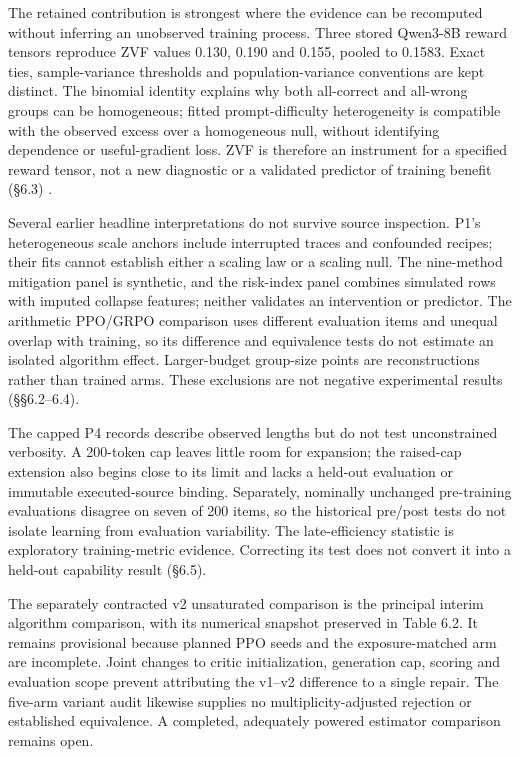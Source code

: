 \documentclass[12pt,a4paper]{report}
\begin{document}
The retained contribution is strongest where the evidence can be
recomputed without inferring an unobserved training process. Three
stored Qwen3-8B reward tensors reproduce ZVF values 0.130, 0.190 and
0.155, pooled to 0.1583. Exact ties, sample-variance thresholds and
population-variance conventions are kept distinct. The binomial identity
explains why both all-correct and all-wrong groups can be homogeneous;
fitted prompt-difficulty heterogeneity is compatible with the observed
excess over a homogeneous null, without identifying dependence or
useful-gradient loss. ZVF is therefore an instrument for a specified
reward tensor, not a new diagnostic or a validated predictor of training
benefit (§6.3) \citep{he2026avspo, nie2026starvation}.

Several earlier headline interpretations do not survive source
inspection. P1's heterogeneous scale anchors include interrupted traces
and confounded recipes; their fits cannot establish either a scaling law
or a scaling null. The nine-method mitigation panel is synthetic, and
the risk-index panel combines simulated rows with imputed collapse
features; neither validates an intervention or predictor. The arithmetic
PPO/GRPO comparison uses different evaluation items and unequal overlap
with training, so its difference and equivalence tests do not estimate
an isolated algorithm effect. Larger-budget group-size points are
reconstructions rather than trained arms. These exclusions are not
negative experimental results (§§6.2--6.4).

The capped P4 records describe observed lengths but do not test
unconstrained verbosity. A 200-token cap leaves little room for
expansion; the raised-cap extension also begins close to its limit and
lacks a held-out evaluation or immutable executed-source binding.
Separately, nominally unchanged pre-training evaluations disagree on
seven of 200 items, so the historical pre/post tests do not isolate
learning from evaluation variability. The late-efficiency statistic is
exploratory training-metric evidence. Correcting its test does not
convert it into a held-out capability result (§6.5).

The separately contracted v2 unsaturated comparison is the principal
interim algorithm comparison, with its numerical snapshot preserved in
Table 6.2. It remains provisional because planned PPO seeds and the
exposure-matched arm are incomplete. Joint changes to critic
initialization, generation cap, scoring and evaluation scope prevent
attributing the v1--v2 difference to a single repair. The five-arm
variant audit likewise supplies no multiplicity-adjusted rejection or
established equivalence. A completed, adequately powered estimator
comparison remains open.
\end{document}

